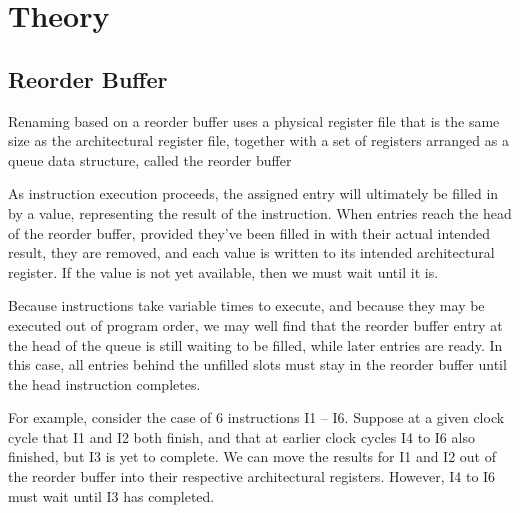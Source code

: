 \chapter{Theory}
\section{Reorder Buffer}
Renaming based on a reorder buffer uses a physical register file that is the same size as the architectural register file, together with a set of registers arranged as a queue data structure, called the reorder buffer

As instruction execution proceeds, the assigned entry will ultimately be filled in by a value, representing the result of the instruction. When entries reach the head of the reorder buffer, provided they've been filled in with their actual intended result, they are removed, and each value is written to its intended architectural register. If the value is not yet available, then we must wait until it is.

Because instructions take variable times to execute, and because they may be executed out of program order, we may well find that the reorder buffer entry at the head of the queue is still waiting to be filled, while later entries are ready. In this case, all entries behind the unfilled slots must stay in the reorder buffer until the head instruction completes.

For example, consider the case of 6 instructions I1 – I6. Suppose at a given clock cycle that I1 and I2 both finish, and that at earlier clock cycles I4 to I6 also finished, but I3 is yet to complete. We can move the results for I1 and I2 out of the reorder buffer into their respective architectural registers. However, I4 to I6 must wait until I3 has completed.

